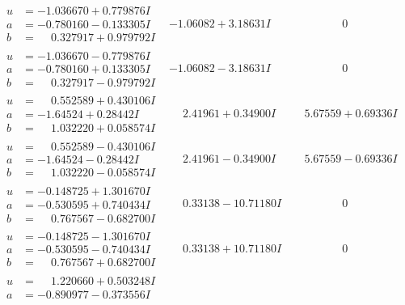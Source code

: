 \documentclass[1p]{elsarticle_modified}
\theoremstyle{definition}
\begin{document}
$$\begin{array}{c|c|c}
 \hline 
\begin{aligned}
u &= -1.036670 + 0.779876 I \\
a &= -0.780160 - 0.133305 I \\
b &= \phantom{-}0.327917 + 0.979792 I\end{aligned}
 & -1.06082 + 3.18631 I & \phantom{-0.000000 } 0 \\ \hline\begin{aligned}
u &= -1.036670 - 0.779876 I \\
a &= -0.780160 + 0.133305 I \\
b &= \phantom{-}0.327917 - 0.979792 I\end{aligned}
 & -1.06082 - 3.18631 I & \phantom{-0.000000 } 0 \\ \hline\begin{aligned}
u &= \phantom{-}0.552589 + 0.430106 I \\
a &= -1.64524 + 0.28442 I \\
b &= \phantom{-}1.032220 + 0.058574 I\end{aligned}
 & \phantom{-}2.41961 + 0.34900 I & \phantom{-}5.67559 + 0.69336 I \\ \hline\begin{aligned}
u &= \phantom{-}0.552589 - 0.430106 I \\
a &= -1.64524 - 0.28442 I \\
b &= \phantom{-}1.032220 - 0.058574 I\end{aligned}
 & \phantom{-}2.41961 - 0.34900 I & \phantom{-}5.67559 - 0.69336 I \\ \hline\begin{aligned}
u &= -0.148725 + 1.301670 I \\
a &= -0.530595 + 0.740434 I \\
b &= \phantom{-}0.767567 - 0.682700 I\end{aligned}
 & \phantom{-}0.33138 - 10.71180 I & \phantom{-0.000000 } 0 \\ \hline\begin{aligned}
u &= -0.148725 - 1.301670 I \\
a &= -0.530595 - 0.740434 I \\
b &= \phantom{-}0.767567 + 0.682700 I\end{aligned}
 & \phantom{-}0.33138 + 10.71180 I & \phantom{-0.000000 } 0 \\ \hline\begin{aligned}
u &= \phantom{-}1.220660 + 0.503248 I \\
a &= -0.890977 - 0.373556 I \\

\end{aligned}
\end{array}$$
\end{document}
